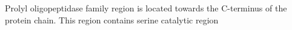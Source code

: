 Prolyl oligopeptidase family region is located towards the C-terminus of the protein chain. This region contains serine catalytic region 